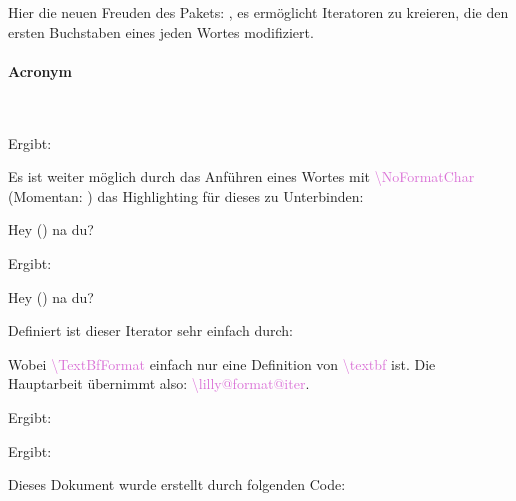 \documentclass{article}
\newcommand*{\blankcmd}[1]{\textcolor{Orchid}{\LILLYxlstTypeWriter\textbackslash #1}}
\begin{document}
\begin{bemerkung}
    Hier die neuen Freuden des Pakets: , es ermöglicht
    Iteratoren zu kreieren, die den ersten Buchstaben eines jeden Wortes modifiziert.
\end{bemerkung}

\paragraph{Acronym}~\\[-\baselineskip]
\begin{latex}
\end{latex}
Ergibt:
\begin{center}
\end{center}
Es ist weiter möglich durch das Anführen eines Wortes mit \blankcmd{NoFormatChar} (Momentan: \NoFormatChar) das Highlighting für dieses zu Unterbinden:
\begin{latex}
Hey () na du?
\end{latex}
Ergibt:
\begin{center}
    Hey () na du?
\end{center}
Definiert ist dieser Iterator sehr einfach durch:
Wobei \blankcmd{TextBfFormat} einfach nur eine Definition von \blankcmd{textbf} ist. Die Hauptarbeit übernimmt also:
\blankcmd{lilly@format@iter}.

\begin{latex}
\end{latex}
Ergibt:
\begin{center}
\end{center}

\begin{latex}
\end{latex}
Ergibt:
\begin{center}
\end{center}

\clearpage

Dieses Dokument wurde erstellt durch folgenden Code:
\end{document}
